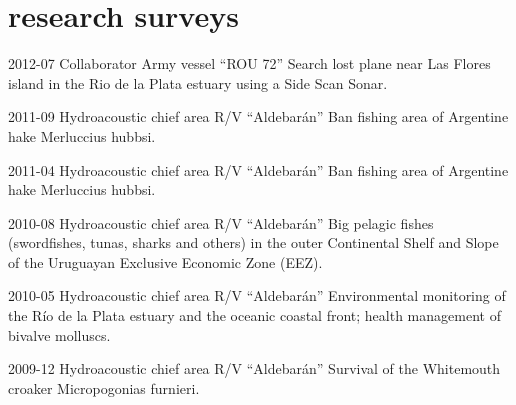 \documentclass[]{friggeri-cv} %
\begin{document}
\section{research surveys}
\begin{entrylist}

\entry
{2012-07}
{Collaborator}
{Army vessel ``ROU 72''}
{Search lost plane near Las Flores island in the Rio de la Plata estuary using a Side Scan Sonar.}

\entry
{2011-09}
{Hydroacoustic chief area}
{R/V ``Aldebarán''}
{Ban fishing area of Argentine hake {\sppfont \color{textcolor} Merluccius hubbsi}.}

\entry
{2011-04}
{Hydroacoustic chief area}
{R/V ``Aldebarán''}
{Ban fishing area of Argentine hake {\sppfont \color{textcolor} Merluccius hubbsi}.}

\entry
{2010-08}
{Hydroacoustic chief area}
{R/V ``Aldebarán''}
{Big pelagic fishes (swordfishes, tunas, sharks and others) in the outer Continental Shelf and Slope of the Uruguayan Exclusive Economic Zone (EEZ).}

\entry
{2010-05}
{Hydroacoustic chief area}
{R/V ``Aldebarán''}
{Environmental monitoring of the Río de la Plata estuary and the oceanic coastal front; health management of bivalve molluscs.}

\entry
{2009-12}
{Hydroacoustic chief area}
{R/V ``Aldebarán''}
{Survival of the Whitemouth croaker {\sppfont \color{textcolor} Micropogonias furnieri}.}

\end{entrylist}
\end{document}

